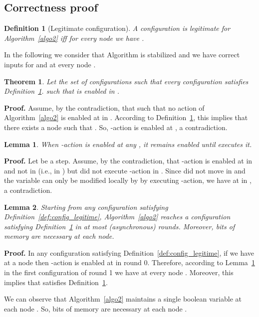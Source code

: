 \documentclass[11pt,letterpaper,onecolumn]{article}
\newtheorem{definition}{Definition}
\newtheorem{theorem}{Theorem}
\newtheorem{lemma}{Lemma}
\newenvironment{proof}{\noindent \begin{rm}{\textbf{Proof.} }}{\hspace*{\fill}\par\end{rm} \vspace{.3cm}}
\begin{document}
\subsection{Correctness proof}

\begin{definition}[Legitimate configuration]
\label{def:config_legitime_cvc}
A configuration  is legitimate for Algorithm~\ref{algo2} iff for every node  we have .
\end{definition}

In the following we consider that Algorithm  is stabilized and we have correct inputs for  and  at every node .

\begin{theorem}
\label{thm:cvc_enable_action}
Let the set of configurations  such that every configuration  satisfies Definition~\ref{def:config_legitime_cvc}.  such that  is enabled in .
\end{theorem}

\begin{proof}
Assume, by the contradiction, that  such that  no action of Algorithm~\ref{algo2} is enabled at  in . According to Definition~\ref{def:config_legitime_cvc}, this implies that there exists a node  such that . So, -action is enabled at , a contradiction.
\end{proof}

\begin{lemma}
\label{lem:VC-action}
When -action is enabled at any , it remains enabled until  executes it.
\end{lemma}

\begin{proof}
Let  be a step. Assume, by the contradiction, that -action is enabled at  in  and not in  (i.e.,  in ) but  did not execute -action in . Since  did not move in  and the variable  can only be modified locally by  by executing -action, we have  at  in , a contradiction.
\end{proof}

\begin{lemma}
\label{lem:config_legitime_cvc_round}
Starting from any configuration satisfying Definition~\ref{def:config_legitime}, Algorithm~\ref{algo2} reaches a configuration satisfying Definition~\ref{def:config_legitime_cvc} in at most  (asynchronous) rounds. Moreover,  bits of memory are necessary at each node.
\end{lemma}

\begin{proof}
In any configuration satisfying Definition~\ref{def:config_legitime}, if we have  at a node  then -action is enabled at  in round 0. Therefore, according to Lemma~\ref{lem:VC-action} in the first configuration  of round 1 we have  at every node . Moreover, this implies that  satisfies Definition~\ref{def:config_legitime_cvc}.

We can observe that Algorithm~\ref{algo2} maintains a single boolean variable  at each node . So,  bits of memory are necessary at each node .
\end{proof}
\end{document}
